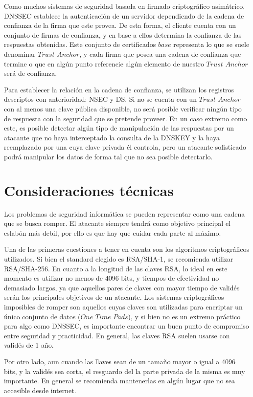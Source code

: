 Como muchos sistemas de seguridad basada en firmado criptogr\'afico asim\'atrico, DNSSEC establece la autenticaci\'on de un servidor dependiendo de la cadena de confianza de la firma que este provea. De esta forma, el cliente cuenta con un conjunto de firmas de confianza, y en base a ellos determina la confianza de las respuestas obtenidas. Este conjunto de certificados $base$ representa lo que se suele denominar  $Trust$ $Anchor$, y cada firma que posea una cadena de confianza que termine o que en algún punto referencie alg\'un elemento de nuestro $Trust$ $Anchor$ ser\'a de confianza.

Para establecer la relaci\'on en la cadena de confianza, se utilizan los registros descriptos con anterioridad: NSEC y DS. Si no se cuenta con un $Trust$ $Anchor$ con al menos una clave p\'ublica disponible, no ser\'a posible verificar ning\'un tipo de respuesta con la seguridad que se pretende proveer. En un caso extremo como este, es posible detectar alg\'un tipo de manipulaci\'on de las respuestas por un atacante que no haya interceptado la consulta de la DNSKEY y la haya reemplazado por una cuya clave privada \'el controla, pero un atacante sofisticado podr\'a manipular los datos de forma tal que no sea posible detectarlo.

\section{Consideraciones t\'ecnicas}

Los problemas de seguridad inform\'atica se pueden representar como una cadena que se busca romper. El atacante siempre tendr\'a como objetivo principal el eslab\'on m\'as debil, por ello es que hay que cuidar cada parte al m\'aximo.

Una de las primeras cuestiones a tener en cuenta son los algoritmos criptogr\'aficos utilizados. Si bien el standard elegido es RSA/SHA-1, se recomienda utilizar RSA/SHA-256. En cuanto a la longitud de las claves RSA, lo ideal en este momento es utilizar no menos de 4096 bits, y tiempos de efectividad no demasiado largos, ya que aquellos pares de claves con mayor tiempo de valid\'es ser\'an los principales objetivos de un atacante. Los sistemas criptogr\'aficos imposibles de romper son aquellos cuyas claves son utilizadas para encriptar un \'unico conjunto de datos ($One$ $Time$ $Pads$), y si bien no es un extremo pr\'actico para algo como DNSSEC, es importante encontrar un buen punto de compromiso entre seguridad y practicidad. En general, las claves RSA suelen usarse con valid\'es de 1 a\~no.

Por otro lado, aun cuando las llaves sean de un tama\~no mayor o igual a 4096 bits, y la valid\'es sea corta, el resguardo del la parte privada de la misma es muy importante. En general se recomienda mantenerlas en alg\'un lugar que no sea accesible desde internet.
